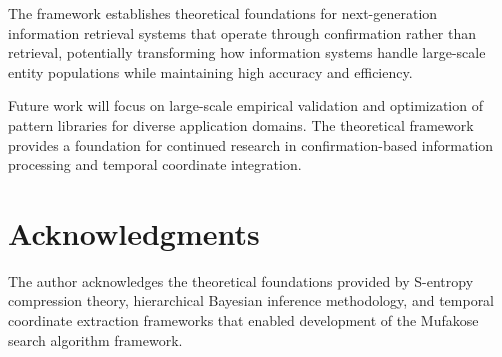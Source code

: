 \documentclass[12pt,a4paper]{article}
\begin{document}
The framework establishes theoretical foundations for next-generation information retrieval systems that operate through confirmation rather than retrieval, potentially transforming how information systems handle large-scale entity populations while maintaining high accuracy and efficiency.

Future work will focus on large-scale empirical validation and optimization of pattern libraries for diverse application domains. The theoretical framework provides a foundation for continued research in confirmation-based information processing and temporal coordinate integration.

\section{Acknowledgments}

The author acknowledges the theoretical foundations provided by S-entropy compression theory, hierarchical Bayesian inference methodology, and temporal coordinate extraction frameworks that enabled development of the Mufakose search algorithm framework.
\end{document}
